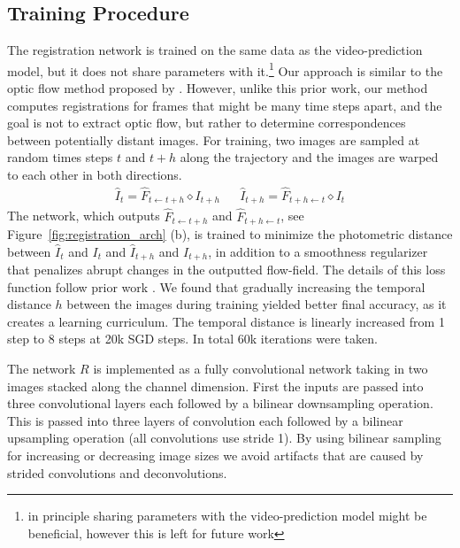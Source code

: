 \subsection{Training Procedure}
\label{subsec:training}

The registration network is trained on the same data as the video-prediction model, but it does not share parameters with it.\footnote{in principle sharing parameters with the video-prediction model might be beneficial, however this is left for future work} Our approach is similar to the optic flow method proposed by \cite{meister2017unflow}. However, unlike this prior work, our method computes registrations for frames that might be many time steps apart, and the goal is not to extract optic flow, but rather to determine correspondences between potentially distant images. For training, two images are sampled at random times steps $t$ and $t+h$ along the trajectory and the images are warped to each other in both directions. 
\begin{align}
\hat{I}_{t} = \hat{F}_{t \leftarrow t +h} \diamond  I_{t+h} &&
\hat{I}_{t+h} = \hat{F}_{t+h \leftarrow t} \diamond  I_{t}
\end{align}
The network, which outputs $\hat{F}_{t \leftarrow t +h}$ and $\hat{F}_{t+h \leftarrow t}$, see Figure~\ref{fig:registration_arch} (b), is trained to minimize the photometric distance between $\hat{I}_t$ and $I_t$ and $\hat{I}_{t+h}$ and $I_{t+h}$, in addition to a smoothness regularizer that penalizes abrupt changes in the outputted flow-field. The details of this loss function follow prior work \cite{meister2017unflow}. We found that gradually increasing the temporal distance $h$ between the images during training yielded better final accuracy, as it creates a learning curriculum. The temporal distance is linearly increased from 1 step to 8 steps at 20k SGD steps. In total 60k iterations were taken.

The network $R$ is implemented as a fully convolutional network taking in two images stacked along the channel dimension. First the inputs are passed into three convolutional layers each followed by a bilinear downsampling operation. This is passed into three layers of convolution each followed by a bilinear upsampling operation (all convolutions use stride 1). By using bilinear sampling for increasing or decreasing image sizes we avoid artifacts that are caused by strided convolutions and deconvolutions.


